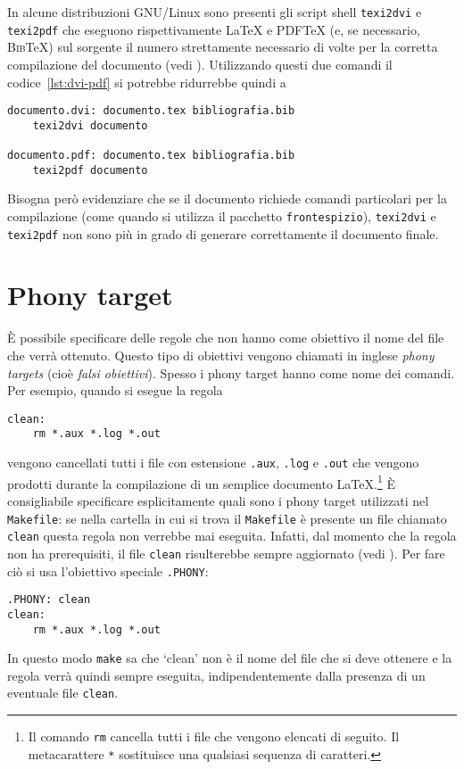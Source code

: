 In alcune distribuzioni GNU/Linux sono presenti gli script shell \verb|texi2dvi|
e \verb|texi2pdf| che eseguono rispettivamente \LaTeX{}
e \textsc{PDF}\TeX{}
(e, se necessario, \textsc{Bib}\TeX) sul sorgente il numero strettamente
necessario di volte per la corretta compilazione del documento (vedi
\textcite[63]{caucci:tabelle}).  Utilizzando questi due comandi il
codice~\ref{lst:dvi-pdf} si potrebbe ridurrebbe quindi a
\begin{lstlisting}
documento.dvi: documento.tex bibliografia.bib
	texi2dvi documento

documento.pdf: documento.tex bibliografia.bib
	texi2pdf documento
\end{lstlisting}
Bisogna però evidenziare che se il documento richiede comandi particolari per la
compilazione (come quando si utilizza il pacchetto \verb|frontespizio|),
\verb|texi2dvi| e \verb|texi2pdf| non sono più in grado di generare
correttamente il documento finale.


\section{Phony target}
\label{sec:phony}

È possibile specificare delle regole che non hanno come obiettivo il nome del
file che verrà ottenuto.  Questo tipo di obiettivi vengono chiamati in inglese
\emph{phony targets} (cioè \emph{falsi obiettivi}).  Spesso i phony target hanno
come nome dei comandi. Per esempio, quando si esegue la regola
\begin{lstlisting}
clean:
	rm *.aux *.log *.out
\end{lstlisting}
vengono cancellati tutti i file con estensione \verb|.aux|, \verb|.log| e
\verb|.out| che vengono prodotti durante la compilazione di un semplice
documento
\LaTeX.\footnote{Il comando \texttt{rm} cancella tutti i file che vengono
  elencati di seguito.  Il metacarattere \texttt{*} sostituisce una qualsiasi
  sequenza di caratteri.}
È consigliabile specificare esplicitamente quali sono i phony target utilizzati
nel \verb|Makefile|: se nella cartella in cui si trova il \verb|Makefile| è
presente un file chiamato \verb|clean| questa regola non verrebbe mai eseguita.
Infatti, dal momento che la regola non ha prerequisiti, il file \texttt{clean}
risulterebbe sempre aggiornato (vedi \textcite[31]{gnu:make}).  Per fare ciò si
usa l'obiettivo speciale \verb|.PHONY|:
\begin{lstlisting}
.PHONY: clean
clean:
	rm *.aux *.log *.out
\end{lstlisting}
In questo modo \verb|make| sa che `clean' non è il nome del file che si deve
ottenere e la regola verrà quindi sempre eseguita, indipendentemente dalla
presenza di un eventuale file \verb|clean|.

